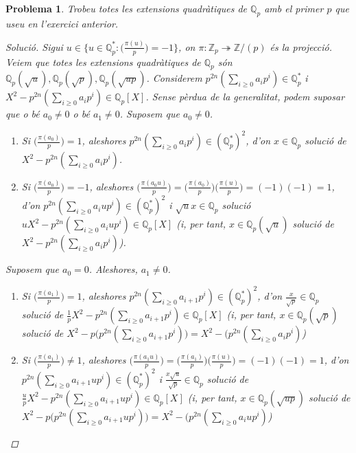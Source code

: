 \documentclass[compress]{article}
\newtheorem{problema}{Problema}
\theoremstyle{definition}
\begin{document}
\begin{problema}
    Trobeu totes les extensions quadràtiques de $\mathbb{Q}_{p}$ amb el primer $p$ que useu en l’exercici anterior.
    \begin{proof}[Solució]
        Sigui $u\in\{u\in\mathbb{Q}_{p}^{*}:\big(\frac{\pi(u)}{p}\big)=-1\}$, on $\pi:\mathbb{Z}_{p}\twoheadrightarrow\mathbb{Z}/(p)$ és la projecció. Veiem que totes les extensions quadràtiques de $\mathbb{Q}_{p}$ són $\mathbb{Q}_{p}(\sqrt{u}),\mathbb{Q}_{p}(\sqrt{p}),\mathbb{Q}_{p}(\sqrt{up})$. Considerem $p^{2n}(\sum_{i\geq0}a_{i}p^{i})\in\mathbb{Q}_{p}^{*}$ i $X^{2}-p^{2n}(\sum_{i\geq0}a_{i}p^{i})\in\mathbb{Q}_{p}[X]$. Sense pèrdua de la generalitat, podem suposar que o bé $a_{0}\neq0$ o bé $a_{1}\neq0$. Suposem que $a_{0}\neq0$.
        \begin{enumerate}
            \item Si $\big(\frac{\pi(a_{0})}{p}\big)=1$, aleshores $p^{2n}(\sum_{i\geq0}a_{i}p^{i})\in(\mathbb{Q}_{p}^{*})^{2}$, d'on $x\in\mathbb{Q}_{p}$ solució de $X^{2}-p^{2n}(\sum_{i\geq0}a_{i}p^{i})$.
            \item Si $\big(\frac{\pi(a_{0})}{p}\big)=-1$, aleshores $\big(\frac{\pi(a_{0}u)}{p}\big)
            =\big(\frac{\pi(a_{0})}{p}\big)\big(\frac{\pi(u)}{p}\big)
            =(-1)(-1)=1$, d'on $p^{2n}(\sum_{i\geq0}a_{i}up^{i})\in(\mathbb{Q}_{p}^{*})^{2}$ i $\sqrt{u}x\in\mathbb{Q}_{p}$ solució $uX^{2}-p^{2n}(\sum_{i\geq0}a_{i}up^{i})\in\mathbb{Q}_{p}[X]$ (i, per tant, $x\in\mathbb{Q}_{p}(\sqrt{u})$ solució de $X^{2}-p^{2n}(\sum_{i\geq0}a_{i}p^{i})$).
        \end{enumerate}
        Suposem que $a_{0}=0$. Aleshores, $a_{1}\neq0$.
        \begin{enumerate}
            \item Si $\big(\frac{\pi(a_{1})}{p}\big)=1$, aleshores $p^{2n}(\sum_{i\geq0}a_{i+1}p^{i})\in(\mathbb{Q}_{p}^{*})^{2}$, d'on $\frac{x}{\sqrt{p}}\in\mathbb{Q}_{p}$ solució de $\frac{1}{p}X^{2}-p^{2n}(\sum_{i\geq0}a_{i+1}p^{i})\in\mathbb{Q}_{p}[X]$ (i, per tant, $x\in\mathbb{Q}_{p}(\sqrt{p})$ solució de $X^{2}-p\big(p^{2n}(\sum_{i\geq0}a_{i+1}p^{i})\big)=X^{2}-(p^{2n}(\sum_{i\geq0}a_{i}p^{i})$)
            \item Si $\big(\frac{\pi(a_{1})}{p}\big)\neq1$, aleshores $\big(\frac{\pi(a_{1}u)}{p}\big)
            =\big(\frac{\pi(a_{1})}{p}\big)\big(\frac{\pi(u)}{p}\big)
            =(-1)(-1)=1$, d'on $p^{2n}(\sum_{i\geq0}a_{i+1}up^{i})\in(\mathbb{Q}_{p}^{*})^{2}$ i $\frac{x\sqrt{u}}{\sqrt{p}}\in\mathbb{Q}_{p}$ solució de $\frac{u}{p}X^{2}-p^{2n}(\sum_{i\geq0}a_{i+1}up^{i})\in\mathbb{Q}_{p}[X]$ (i, per tant, $x\in\mathbb{Q}_{p}(\sqrt{up})$ solució de $X^{2}-p\big(p^{2n}(\sum_{i\geq0}a_{i+1}up^{i})\big)=X^{2}-(p^{2n}(\sum_{i\geq0}a_{i}up^{i})$)

\end{enumerate}
\end{proof}
\end{problema}
\end{document}
